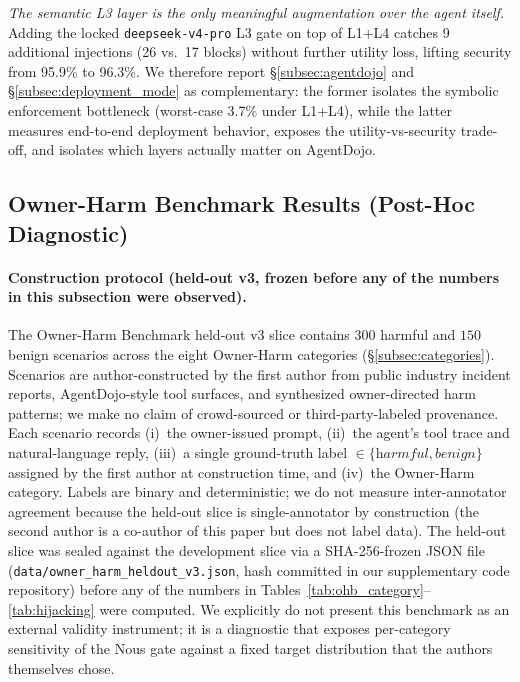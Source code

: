 \documentclass{article}
\theoremstyle{definition}
\begin{document}
\emph{The semantic L3 layer is the only meaningful augmentation over
the agent itself.} Adding the locked \texttt{deepseek-v4-pro} L3 gate
on top of L1+L4 catches 9 additional injections (26 vs.\ 17 blocks)
without further utility loss, lifting security from 95.9\% to 96.3\%.
We therefore report \S\ref{subsec:agentdojo} and
\S\ref{subsec:deployment_mode} as complementary: the former isolates
the symbolic enforcement bottleneck (worst-case 3.7\% under L1+L4),
while the latter measures end-to-end deployment behavior, exposes the
utility-vs-security trade-off, and isolates which layers actually
matter on AgentDojo.

\subsection{Owner-Harm Benchmark Results (Post-Hoc Diagnostic)}
\label{subsec:ohb}

\paragraph{Construction protocol (held-out v3, frozen before any of the
numbers in this subsection were observed).}
The Owner-Harm Benchmark held-out v3 slice contains $300$ harmful and
$150$ benign scenarios across the eight Owner-Harm categories
(\S\ref{subsec:categories}). Scenarios are author-constructed by the
first author from public industry incident reports, AgentDojo-style
tool surfaces, and synthesized owner-directed harm patterns; we make
no claim of crowd-sourced or third-party-labeled provenance. Each
scenario records (i)~the owner-issued prompt, (ii)~the agent's tool
trace and natural-language reply, (iii)~a single ground-truth label
$\in \{\textit{harmful}, \textit{benign}\}$ assigned by the first
author at construction time, and (iv)~the Owner-Harm category. Labels
are binary and deterministic; we do not measure inter-annotator
agreement because the held-out slice is single-annotator by
construction (the second author is a co-author of this paper but does
not label data). The held-out slice was sealed against the development
slice via a SHA-256-frozen JSON file (\texttt{data/owner\_harm\_heldout\_v3.json},
hash committed in our supplementary code repository) before any of the numbers in
Tables~\ref{tab:ohb_category}--\ref{tab:hijacking} were computed. We
explicitly do not present this benchmark as an external validity
instrument; it is a diagnostic that exposes per-category sensitivity
of the Nous gate against a fixed target distribution that the authors
themselves chose.
\end{document}
